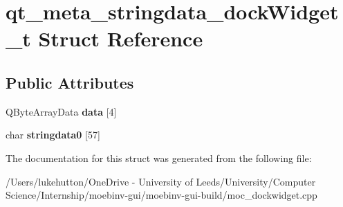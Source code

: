 \hypertarget{structqt__meta__stringdata__dock_widget__t}{}\section{qt\+\_\+meta\+\_\+stringdata\+\_\+dock\+Widget\+\_\+t Struct Reference}
\label{structqt__meta__stringdata__dock_widget__t}
\subsection*{Public Attributes}
\begin{DoxyCompactItemize}
\item 
\mbox{\label{structqt__meta__stringdata__dock_widget__t_a118c54d315eed59d78416e5e4145068d}} 
Q\+Byte\+Array\+Data {\bfseries data} \mbox{[}4\mbox{]}
\item 
\mbox{\label{structqt__meta__stringdata__dock_widget__t_a1b94e2371992a973536e35688d5f62ee}} 
char {\bfseries stringdata0} \mbox{[}57\mbox{]}
\end{DoxyCompactItemize}


The documentation for this struct was generated from the following file\+:\begin{DoxyCompactItemize}
\item 
/\+Users/lukehutton/\+One\+Drive -\/ University of Leeds/\+University/\+Computer Science/\+Internship/moebinv-\/gui/moebinv-\/gui-\/build/moc\+\_\+dockwidget.\+cpp\end{DoxyCompactItemize}
